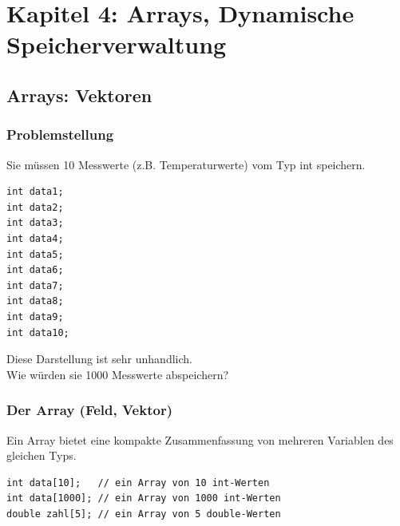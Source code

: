 
\section{Kapitel 4: Arrays, Dynamische Speicherverwaltung}
\label{sec:Kapitel 4: Arrays, Dynamische Speicherverwaltung}


\subsection{Arrays: Vektoren}
\label{sec:Arrays: Vektoren}

\subsubsection{Problemstellung}
\label{sec:Problemstellung}
Sie müssen 10 Messwerte (z.B. Temperaturwerte) vom Typ int speichern.
\noindent
\begin{minipage}{\linewidth}
\begin{lstlisting}
int data1;
int data2;
int data3;
int data4;
int data5;
int data6;
int data7;
int data8;
int data9;
int data10;
\end{lstlisting}
\end{minipage}

Diese Darstellung ist sehr unhandlich.\\
Wie würden sie 1000 Messwerte abspeichern?

\subsubsection{Der Array (Feld, Vektor)}
\label{sec:Der Array (Feld, Vektor)}
Ein Array bietet eine kompakte Zusammenfassung von mehreren Variablen des gleichen Typs.
\noindent
\begin{minipage}{\linewidth}
\begin{lstlisting}
int data[10];	// ein Array von 10 int-Werten
int data[1000];	// ein Array von 1000 int-Werten
double zahl[5];	// ein Array von 5 double-Werten
\end{lstlisting}
\end{minipage}

